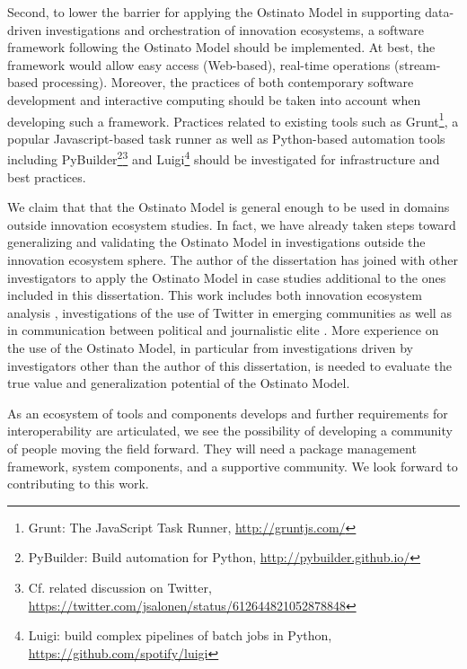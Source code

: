 Second, to lower the barrier for applying the Ostinato Model in supporting data-driven investigations and orchestration of innovation ecosystems, a software framework following the Ostinato Model should be implemented. At best, the framework would allow easy access (Web-based), real-time operations (stream-based processing). Moreover, the practices of both contemporary software development and interactive computing should be taken into account when developing such a framework. Practices related to existing tools such as Grunt\footnote{Grunt: The JavaScript Task Runner, \url{http://gruntjs.com/}}, a popular Javascript-based task runner as well as Python-based automation tools including PyBuilder\footnote{PyBuilder: Build automation for Python, \url{http://pybuilder.github.io/}}\footnote{Cf. related discussion on Twitter, \url{https://twitter.com/jsalonen/status/612644821052878848}} and Luigi\footnote{Luigi: build complex pipelines of batch jobs in Python, \url{https://github.com/spotify/luigi}} should be investigated for infrastructure and best practices.

We claim that that the Ostinato Model is general enough to be used in domains outside innovation ecosystem studies. In fact, we have already taken steps toward generalizing and validating the Ostinato Model in investigations outside the innovation ecosystem sphere. The author of the dissertation has joined with other investigators to apply the Ostinato Model in case studies additional to the ones included in this dissertation. This work includes both innovation ecosystem analysis \citep{Russell2015RelationalEcosystems}, investigations of the use of Twitter in emerging communities \citep{Aramo-Immonen2015ExploringData,Jussila2014,Aramo-Immonen2016VisualizingModel} as well as in communication between political and journalistic elite 
\citep{Ruoho2015,Vainikka2015TviittienTwitterissa}. More experience on the use of the Ostinato Model, in particular from investigations driven by investigators other than the author of this dissertation, is needed to evaluate the true value and generalization potential of the Ostinato Model.

As an ecosystem of tools and components develops and further requirements for interoperability are articulated, we see the possibility of developing a community of people moving the field forward. They will need a package management framework, system components, and a supportive community. We look forward to contributing to this work.